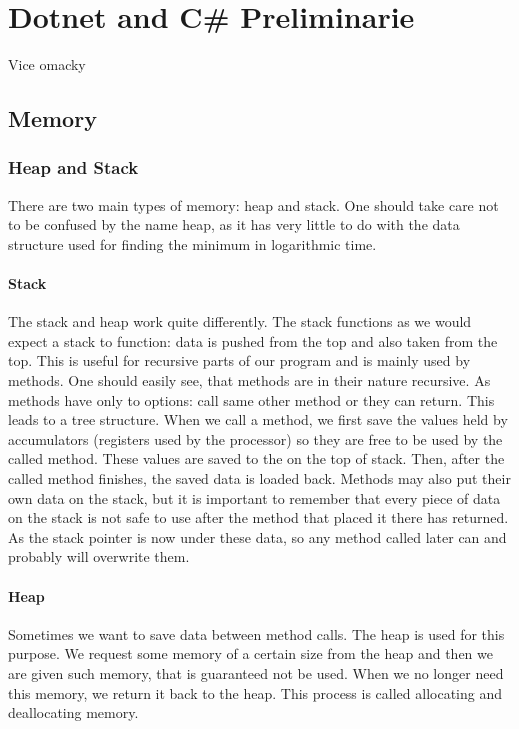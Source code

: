 \chapter{Dotnet and C\# Preliminarie}

Vice omacky

\section{Memory}
\subsection{Heap and Stack}
There are two main types of memory: heap and stack. One should take care not to be confused by the name heap, as it has very little to do with the data structure used for finding the minimum in logarithmic time.

\subsubsection{Stack}
The stack and heap work quite differently. The stack functions as we would expect a stack to function: data is pushed from the top and also taken from the top. This is useful for recursive parts of our program and is mainly used by methods. One should easily see, that methods are in their nature recursive. As methods have only to options: call same other method or they can return. This leads to a tree structure. When we call a method, we first save the values held by accumulators (registers used by the processor) so they are free to be used by the called method. These values are saved to the on the top of stack. Then, after the called method finishes, the saved data is loaded back. Methods may also put their own data on the stack, but it is important to remember that every piece of data on the stack is not safe to use after the method that placed it there has returned. As the stack pointer is now under these data, so any method called later can and probably will overwrite them.

\subsubsection{Heap}
Sometimes we want to save data between method calls. The heap is used for this purpose. We request some memory of a certain size from the heap and then we are given such memory, that is guaranteed not be used. When we no longer need this memory, we return it back to the heap. This process is called allocating and deallocating memory.

